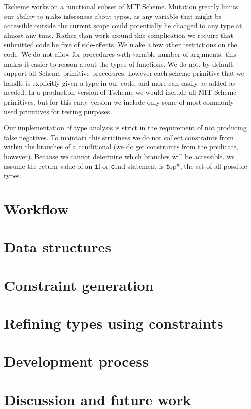 \documentclass[a4paper]{article}
\begin{document}
Tscheme works on a functional subset of MIT Scheme.  Mutation greatly limits 
our ability to make inferences about types, as any variable that might be 
accessible outside the current scope could potentially be changed to any type 
at almost any time.  Rather than work around this complication we require that
submitted code be free of side-effects.  We make a few other restrictions on 
the code.  We do not allow for procedures with variable number of arguments;
this makes it easier to reason about the types of functions.  We do not, by 
default, support all Scheme primitive procedures, however each scheme 
primitive that we handle is explicitly given a type in our code, and more can 
easily be added as needed.  In a production version of Tscheme we would 
include all MIT Scheme primitives, but for this early version we include only 
some of most commonly used primitives for testing purposes.

Our implementation of type analysis is strict in the requirement of not producing 
false negatives.  To maintain this strictness we do not collect constraints 
from within the branches of a conditional (we do get constraints from the 
predicate, however).  Because we cannot determine which branches will be 
accessible, we assume the return value of an {\texttt if} or {\texttt cond}
statement is {\texttt *top*}, the set of all possible types.


\section{Workflow}


\section{Data structures}


\section{Constraint generation}

\section{Refining types using constraints}

\section{Development process}


\section{Discussion and future work}

\end{document}
